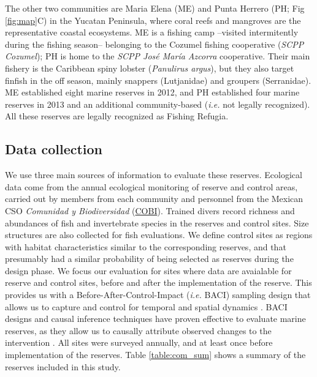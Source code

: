 \documentclass{frontiersSCNS}
\theoremstyle{definition}
\theoremstyle{definition}
\theoremstyle{definition}
\theoremstyle{remark}
\begin{document}
The other two communities are Maria Elena (ME) and Punta Herrero (PH;
Fig \ref{fig:map}C) in the Yucatan Peninsula, where coral reefs and
mangroves are the representative coastal ecosystems. ME is a fishing
camp --visited intermitently during the fishing season-- belonging to
the Cozumel fishing cooperative (\emph{SCPP Cozumel}); PH is home to the
\emph{SCPP José María Azcorra} cooperative. Their main fishery is the
Caribbean spiny lobster (\emph{Panulirus argus}), but they also target
finfish in the off season, mainly snappers (Lutjanidae) and groupers
(Serranidae). ME established eight marine reserves in 2012, and PH
established four marine reserves in 2013 and an additional
community-based (\emph{i.e.} not legally recognized). All these reserves
are legally recognized as Fishing Refugia.

\subsection{Data collection}\label{data-collection}

We use three main sources of information to evaluate these reserves.
Ecological data come from the annual ecological monitoring of reserve
and control areas, carried out by members from each community and
personnel from the Mexican CSO \emph{Comunidad y Biodiversidad}
(\href{www.cobi.org.mx}{COBI}). Trained divers record richness and
abundances of fish and invertebrate species in the reserves and control
sites. Size structures are also collected for fish evaluations. We
define control sites as regions with habitat characteristics similar to
the corresponding reserves, and that presumably had a similar
probability of being selected as reserves during the design phase. We
focus our evaluation for sites where data are avaialable for reserve and
control sites, before and after the implementation of the reserve. This
provides us with a Before-After-Control-Impact (\emph{i.e.} BACI)
sampling design that allows us to capture and control for temporal and
spatial dynamics \citep{depalma_2018,ferraro_2006-oW}. BACI designs and
causal inference techniques have proven effective to evaluate marine
reserves, as they allow us to causally attribute observed changes to the
intervention \citep{moland_2013-VP,Villasenor-Derbez_2018}. All sites
were surveyed annually, and at least once before implementation of the
reserves. Table \ref{table:com_sum} shows a summary of the reserves
included in this study.
\end{document}
